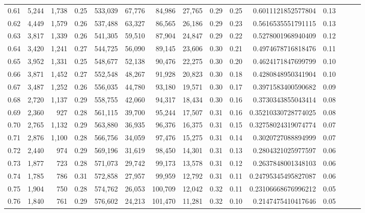 \begin{tabular}{rrrrrrrrrrrrrrr}
0.61 &   5,244 &  1,738 &  0.25 &  533,039 &   67,776 &   84,986 &   27,765 &  0.29 &  0.25 &    0.6011121852577804 &      0.13 \\
0.62 &   4,449 &  1,579 &  0.26 &  537,488 &   63,327 &   86,565 &   26,186 &  0.29 &  0.23 &    0.5616535551791115 &      0.13 \\
0.63 &   3,817 &  1,339 &  0.26 &  541,305 &   59,510 &   87,904 &   24,847 &  0.29 &  0.22 &    0.5278001968940409 &      0.12 \\
0.64 &   3,420 &  1,241 &  0.27 &  544,725 &   56,090 &   89,145 &   23,606 &  0.30 &  0.21 &    0.4974678716818476 &      0.11 \\
0.65 &   3,952 &  1,331 &  0.25 &  548,677 &   52,138 &   90,476 &   22,275 &  0.30 &  0.20 &    0.4624171847699799 &      0.10 \\
0.66 &   3,871 &  1,452 &  0.27 &  552,548 &   48,267 &   91,928 &   20,823 &  0.30 &  0.18 &    0.4280848950341904 &      0.10 \\
0.67 &   3,487 &  1,252 &  0.26 &  556,035 &   44,780 &   93,180 &   19,571 &  0.30 &  0.17 &    0.3971583400590682 &      0.09 \\
0.68 &   2,720 &  1,137 &  0.29 &  558,755 &   42,060 &   94,317 &   18,434 &  0.30 &  0.16 &    0.3730343855043414 &      0.08 \\
0.69 &   2,360 &    927 &  0.28 &  561,115 &   39,700 &   95,244 &   17,507 &  0.31 &  0.16 &   0.35210330728774025 &      0.08 \\
0.70 &   2,765 &  1,132 &  0.29 &  563,880 &   36,935 &   96,376 &   16,375 &  0.31 &  0.15 &   0.32758024319074774 &      0.07 \\
0.71 &   2,876 &  1,100 &  0.28 &  566,756 &   34,059 &   97,476 &   15,275 &  0.31 &  0.14 &    0.3020727088894999 &      0.07 \\
0.72 &   2,440 &    974 &  0.29 &  569,196 &   31,619 &   98,450 &   14,301 &  0.31 &  0.13 &    0.2804321025977597 &      0.06 \\
0.73 &   1,877 &    723 &  0.28 &  571,073 &   29,742 &   99,173 &   13,578 &  0.31 &  0.12 &    0.2637848001348103 &      0.06 \\
0.74 &   1,785 &    786 &  0.31 &  572,858 &   27,957 &   99,959 &   12,792 &  0.31 &  0.11 &   0.24795345495827087 &      0.06 \\
0.75 &   1,904 &    750 &  0.28 &  574,762 &   26,053 &  100,709 &   12,042 &  0.32 &  0.11 &   0.23106668676996212 &      0.05 \\
0.76 &   1,840 &    761 &  0.29 &  576,602 &   24,213 &  101,470 &   11,281 &  0.32 &  0.10 &    0.2147475410417646 &      0.05 \\

\end{tabular}
